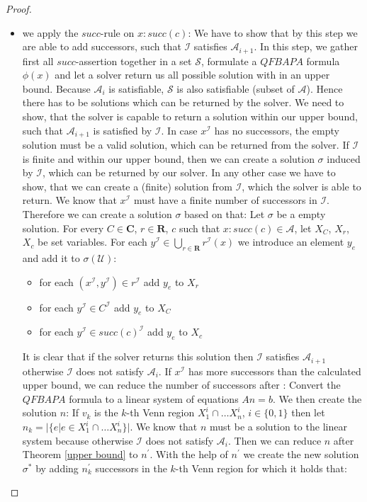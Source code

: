 \documentclass{book}
\theoremstyle{break}
\theoremstyle{definition}
\begin{document}
\begin{proof}
\begin{itemize}
\item we apply the $succ$-rule on $x:succ(c)$: We have to show that by this step we are able to add successors, such that $\mathcal{I}$ satisfies $\mathcal{A}_{i+1}$. In this step, we gather first all $succ$-assertion together in a set $\mathcal{S}$, formulate a $QFBAPA$ formula $\phi(x)$ and let a solver return us all possible solution with in an upper bound. Because $\mathcal{A}_i$ is satisfiable, $\mathcal{S}$ is also satisfiable (subset of $\mathcal{A}$). Hence there has to be solutions which can be returned by the solver. We need to show, that the solver is capable to return a solution within our upper bound, such that $\mathcal{A}_{i+1}$ is satisfied by $\mathcal{I}$. In case $x^\mathcal{I}$ has no successors, the empty solution must be a valid solution, which can be returned from the solver. If $\mathcal{I}$ is finite and within our upper bound, then we can create a solution $\sigma$ induced by $\mathcal{I}$, which can be returned by our solver. In any other case we have to show, that we can create a (finite) solution from $\mathcal{I}$, which the solver is able to return. We know that $x^\mathcal{I}$ must have a finite number of successors in $\mathcal{I}$. Therefore we can create a solution $\sigma$ based on that: Let $\sigma$ be a empty solution. For every $C\in\mathbf{C}$, $r\in\mathbf{R}$, $c$ such that $x:succ(c)\in\mathcal{A}$, let $X_C$, $X_r$, $X_c$ be set variables. For each $y^\mathcal{I}\in \bigcup_{r\in\mathbf{R}}r^\mathcal{I}(x)$ we introduce an element $y_e$ and add it to $\sigma(\mathcal{U})$:
\begin{itemize}
\item for each $(x^\mathcal{I},y^\mathcal{I})\in r^\mathcal{I}$ add $y_e$ to $X_r$
\item for each $y^\mathcal{I}\in C^\mathcal{I}$ add $y_e$ to $X_C$
\item for each $y^\mathcal{I}\in succ(c)^\mathcal{I}$ add $y_e$ to $X_c$
\end{itemize}
It is clear that if the solver returns this solution then $\mathcal{I}$ satisfies $\mathcal{A}_{i+1}$ otherwise $\mathcal{I}$ does not satisfy $\mathcal{A}_i$. If $x^\mathcal{I}$ has more successors than the calculated upper bound, we can reduce the number of successors after \cite{knapsack}: Convert the $QFBAPA$ formula to a linear system of equations $An=b$. We then create the solution $n$: If $v_k$ is the $k$-th Venn region $X_1^i\cap\dots X_n^i$, $i\in\{0,1\}$ then let $n_k=|\{e|e\in X_1^i\cap\dots X_n^i\}|$. We know that $n$ must be a solution to the linear system because otherwise $\mathcal{I}$ does not satisfy $\mathcal{A}_i$. Then we can reduce $n$ after Theorem \ref{upper bound} to $n^\prime$. With the help of $n^\prime$ we create the new solution $\sigma^\ast$ by adding $n^\prime_k$ successors in the $k$-th Venn region for which it holds that:

\end{itemize}
\end{proof}
\end{document}
